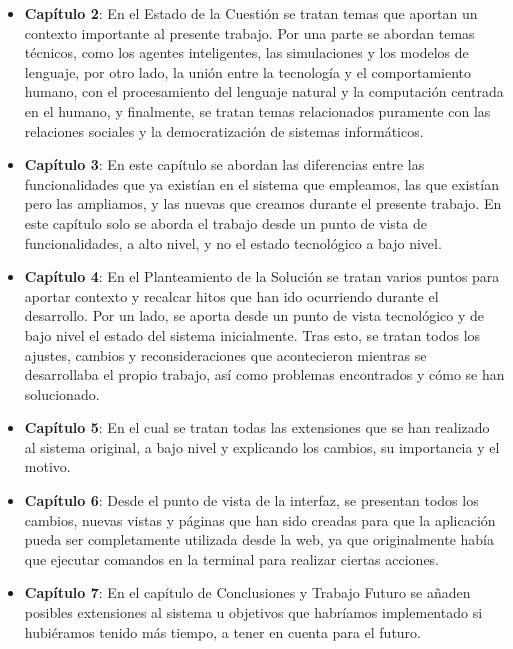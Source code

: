 \begin{itemize}
	
	\item \textbf{Capítulo 2}: En el Estado de la Cuestión se tratan temas que aportan un contexto importante al presente trabajo. Por una parte se abordan temas técnicos, como los agentes inteligentes, las simulaciones y los modelos de lenguaje, por otro lado, la unión entre la tecnología y el comportamiento humano, con el procesamiento del lenguaje natural y la computación centrada en el humano, y finalmente, se tratan temas relacionados puramente con las relaciones sociales y la democratización de sistemas informáticos.
	
	\item \textbf{Capítulo 3}: En este capítulo se abordan las diferencias entre las funcionalidades que ya existían en el sistema que empleamos, las que existían pero las ampliamos, y las nuevas que creamos durante el presente trabajo. En este capítulo solo se aborda el trabajo desde un punto de vista de funcionalidades, a alto nivel, y no el estado tecnológico a bajo nivel.
	
	\item \textbf{Capítulo 4}: En el Planteamiento de la Solución se tratan varios puntos para aportar contexto y recalcar hitos que han ido ocurriendo durante el desarrollo. Por un lado, se aporta desde un punto de vista tecnológico y de bajo nivel el estado del sistema inicialmente. Tras esto, se tratan todos los ajustes, cambios y reconsideraciones que acontecieron mientras se desarrollaba el propio trabajo, así como problemas encontrados y cómo se han solucionado.
	
	\item \textbf{Capítulo 5}: En el cual se tratan todas las extensiones que se han realizado al sistema original, a bajo nivel y explicando los cambios, su importancia y el motivo.
	
	\item \textbf{Capítulo 6}: Desde el punto de vista de la interfaz, se presentan todos los cambios, nuevas vistas y páginas que han sido creadas para que la aplicación pueda ser completamente utilizada desde la web, ya que originalmente había que ejecutar comandos en la terminal para realizar ciertas acciones.
	
	\item \textbf{Capítulo 7}: En el capítulo de Conclusiones y Trabajo Futuro se añaden posibles extensiones al sistema u objetivos que habríamos implementado si hubiéramos tenido más tiempo, a tener en cuenta para el futuro.
	
\end{itemize}
